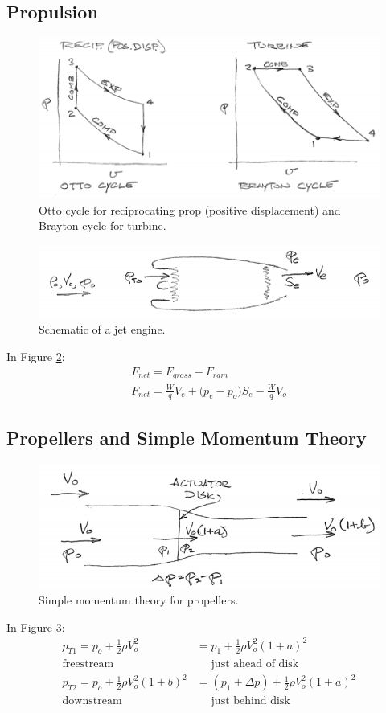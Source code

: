\documentclass[draft=false, titlepage]{article}
\begin{document}
\subsection{Propulsion}
\begin{figure}[ht]
	\centering
	\includegraphics[width=0.8\linewidth]{Figures/p109_cycles.PNG}
	\caption{Otto cycle for reciprocating prop (positive displacement) and Brayton cycle for turbine.}
	\label{fig:p109_cycles}
\end{figure}
\begin{figure}[ht]
	\centering
	\includegraphics[width=0.7\linewidth]{Figures/p109_engine.PNG}
	\caption{Schematic of a jet engine.}
	\label{fig:p109_engine}
\end{figure}
In Figure \ref{fig:p109_engine}:
\begin{gather*}
F_{net} = F_{gross} - F_{ram}\\
F_{net} = \frac{W}{q} V_e + \big(p_e-p_o\big) S_e - \frac{W}{q}V_o
\end{gather*}

\subsection{Propellers and Simple Momentum Theory}
\begin{figure}[ht]
	\centering
	\includegraphics[width=0.8\linewidth]{Figures/p110_propellers.PNG}
	\caption{Simple momentum theory for propellers.}
	\label{fig:p110_propellers}
\end{figure}
In Figure \ref{fig:p110_propellers}:
\begin{align*}
p_{T1} = p_o + \frac{1}{2} \rho V_o^2 &= p_1 + \frac{1}{2} \rho V_o^2 (1+a)^2\\
\text{freestream } &\quad \text{ just ahead of disk}\\
p_{T2} = p_o + \frac{1}{2} \rho V_o^2(1+b)^2 &= (p_1+\Delta p) + \frac{1}{2} \rho V_o^2(1+a)^2\\
\text{downstream } &\quad \text{ just behind disk}
\end{align*}
\end{document}
